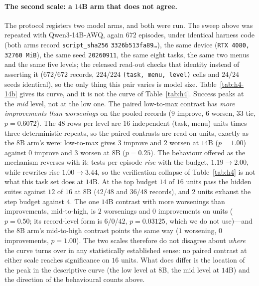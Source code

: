 \documentclass[10pt]{article} %
\begin{document}
\paragraph{The second scale: a $14$B arm that does not agree.}
The protocol registers two model arms, and both were run. The sweep above was repeated with
Qwen3-14B-AWQ, again $672$ episodes, under identical harness code (both arms record
\texttt{script\_sha256} \texttt{3326b513fa89\ldots}), the same device (\texttt{RTX 4080,
32760~MiB}), the same seed \texttt{20260911}, the same eight tasks, the same two menus and
the same five levels; the released read-out checks that identity instead of asserting it
($672/672$ records, $224/224$ \texttt{(task, menu, level)} cells and $24/24$ seeds
identical), so the only thing this pair varies is model size. Table~\ref{tab:h4-14b} gives
its curve, and it is not the curve of Table~\ref{tab:h4}. Success peaks at the \emph{mid}
level, not at the low one. The paired low-to-max contrast has \emph{more improvements than
worsenings} on the pooled records ($9$ improve, $6$ worsen, $33$ tie, $p{=}0.6072$). The
$48$ rows per level are $16$ independent (task, menu) units times three deterministic
repeats, so the paired contrasts are read on units, exactly as the $8$B arm's were:
low-to-max gives $3$ improve and $2$ worsen at $14$B ($p{=}1.00$) against $0$ improve and
$3$ worsen at $8$B ($p{=}0.25$). The behaviour offered as the mechanism reverses with
it: tests per episode \emph{rise} with the budget, $1.19\to2.00$, while rewrites rise
$1.00\to3.44$, so the verification collapse of Table~\ref{tab:h4} is not what this task set
does at $14$B. At the top budget $14$ of $16$ units pass the hidden suites against $12$ of
$16$ at $8$B ($42$/$48$ and $36$/$48$ records), and $2$ units exhaust the step budget against
$4$. The one $14$B contrast with more worsenings than improvements, mid-to-high, is $2$
worsenings and $0$ improvements on units ($p{=}0.50$; its record-level form is $6$/$0$/$42$,
$p{=}0.03125$, which we do not use)---and the $8$B arm's mid-to-high contrast points the same
way ($1$ worsening, $0$ improvements, $p{=}1.00$). The two scales therefore do not disagree
about \emph{where} the curve turns over in any statistically established sense: no paired
contrast at either scale reaches significance on $16$ units. What does differ is the location
of the peak in the descriptive curve (the low level at $8$B, the mid level at $14$B) and the
direction of the behavioural counts above.
\end{document}
